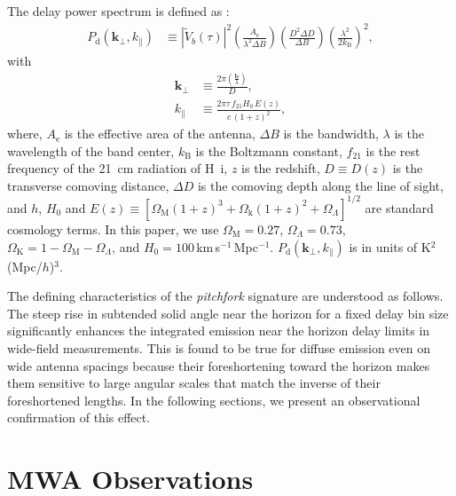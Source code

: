 \documentclass[preprint2,apjl,numberedappendix,twocolappendix,appendixfloats]{emulateapj}
\begin{document}
The delay power spectrum is defined as \citep[][Paper~I]{par12a}:
\begin{align}\label{eqn:delay-power-spectrum}
  P_\textrm{d}(\boldsymbol{k}_\perp,k_\parallel) &\equiv |\widetilde{V}_b(\tau)|^2\left(\frac{A_\textrm{e}}{\lambda^2\Delta B}\right)\left(\frac{D^2\Delta D}{\Delta B}\right)\left(\frac{\lambda^2}{2k_\textrm{B}}\right)^2,
\end{align}
with
\begin{align}
  \boldsymbol{k}_\perp &\equiv \frac{2\pi(\frac{\boldsymbol{b}}{\lambda})}{D}, \\
  k_\parallel &\equiv \frac{2\pi\tau\,f_{21}H_0\,E(z)}{c\,(1+z)^2}, 
\end{align}
where, $A_\textrm{e}$ is the effective area of the antenna, $\Delta B$ is the bandwidth, $\lambda$ is the wavelength of the band center, $k_\textrm{B}$ is the Boltzmann constant, $f_{21}$ is the rest frequency of the 21~cm radiation of H~{\sc i}, $z$ is the redshift, $D\equiv D(z)$ is the transverse comoving distance, $\Delta D$ is the comoving depth along the line of sight, and $h$, $H_0$ and $E(z)\equiv [\Omega_\textrm{M}(1+z)^3+\Omega_\textrm{k}(1+z)^2+\Omega_\Lambda]^{1/2}$ are standard cosmology terms. In this paper, we use $\Omega_\textrm{M}=0.27$, $\Omega_\Lambda=0.73$, $\Omega_\textrm{K}=1-\Omega_\textrm{M}-\Omega_\Lambda$, and $H_0=100\,$km$\,$s$^{-1}\,$Mpc$^{-1}$. $P_\textrm{d}(\boldsymbol{k}_\perp,k_\parallel)$ is in units of K$^2$(Mpc/$h$)$^3$.

The defining characteristics of the {\it pitchfork} signature are understood as follows. The steep rise in subtended solid angle near the horizon for a fixed delay bin size significantly enhances the integrated emission near the horizon delay limits in wide-field measurements. This is found to be true for diffuse emission even on wide antenna spacings because their foreshortening toward the horizon makes them sensitive to large angular scales that match the inverse of their foreshortened lengths. In the following sections, we present an observational confirmation of this effect.

\section{MWA Observations}\label{sec:MWA}
\end{document}
